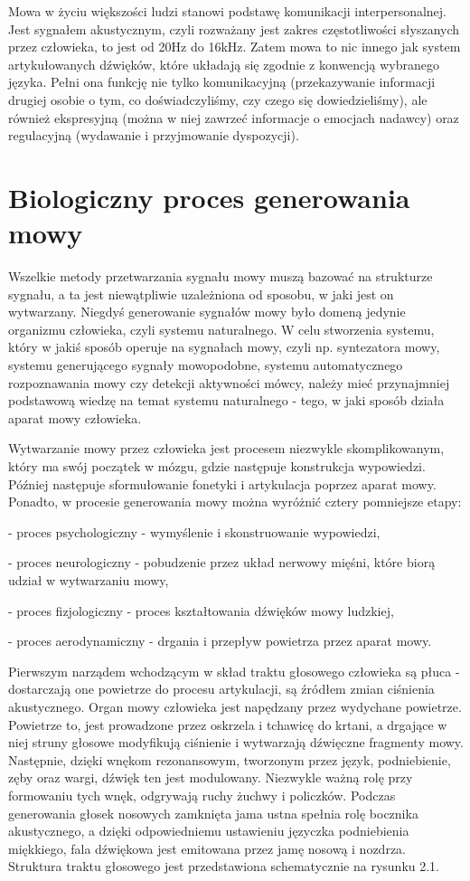 \documentclass[eng,printmode]{mgr}
\begin{document}
 Mowa w życiu większości ludzi stanowi podstawę komunikacji interpersonalnej. Jest sygnałem akustycznym, czyli rozważany jest zakres częstotliwości słyszanych przez człowieka, to jest od 20Hz do 16kHz. Zatem mowa to nic innego jak system artykułowanych dźwięków, które układają się zgodnie z konwencją wybranego języka. Pełni ona funkcję nie tylko komunikacyjną (przekazywanie informacji drugiej osobie o tym, co doświadczyliśmy, czy czego się dowiedzieliśmy), ale również ekspresyjną (można w niej zawrzeć informacje o emocjach nadawcy) oraz regulacyjną (wydawanie i przyjmowanie dyspozycji). 
 
 
 \section{Biologiczny proces generowania mowy}
 Wszelkie metody przetwarzania sygnału mowy muszą bazować na strukturze sygnału, a ta jest niewątpliwie uzależniona od sposobu, w jaki jest on wytwarzany. Niegdyś generowanie sygnałów mowy było domeną jedynie organizmu człowieka, czyli systemu naturalnego. W celu stworzenia systemu, który w jakiś sposób operuje na sygnałach mowy, czyli np. syntezatora mowy, systemu generującego sygnały mowopodobne, systemu automatycznego rozpoznawania mowy czy detekcji aktywności mówcy, należy mieć przynajmniej podstawową wiedzę na temat systemu naturalnego - tego, w jaki sposób działa aparat mowy człowieka.
 
 Wytwarzanie mowy przez człowieka jest procesem niezwykle skomplikowanym, który ma swój początek w mózgu, gdzie następuje konstrukcja wypowiedzi. Później następuje sformułowanie fonetyki i artykulacja poprzez aparat mowy. Ponadto, w procesie generowania mowy można wyróżnić cztery pomniejsze etapy:
	 
	 - proces psychologiczny - wymyślenie i skonstruowanie wypowiedzi,
	 
	 - proces neurologiczny - pobudzenie przez układ nerwowy mięśni, które biorą udział w wytwarzaniu mowy,
	 
	 - proces fizjologiczny - proces kształtowania dźwięków mowy ludzkiej,
	 
	 - proces aerodynamiczny - drgania i przepływ powietrza przez aparat mowy. 
  
  Pierwszym narządem wchodzącym w skład traktu głosowego człowieka są płuca - dostarczają one powietrze do procesu artykulacji, są źródłem zmian ciśnienia akustycznego. Organ mowy człowieka jest napędzany przez wydychane powietrze. Powietrze to, jest prowadzone przez oskrzela i tchawicę do krtani, a drgające w niej struny głosowe modyfikują ciśnienie i wytwarzają dźwięczne fragmenty mowy.  Następnie, dzięki wnękom rezonansowym, tworzonym przez język, podniebienie, zęby oraz wargi, dźwięk ten jest modulowany. Niezwykle ważną rolę przy formowaniu tych wnęk, odgrywają ruchy żuchwy i policzków. Podczas generowania głosek nosowych zamknięta jama ustna spełnia rolę bocznika akustycznego, a dzięki odpowiedniemu ustawieniu języczka podniebienia miękkiego, fala dźwiękowa jest emitowana przez jamę nosową i nozdrza. Struktura traktu głosowego jest przedstawiona schematycznie na rysunku 2.1.
\end{document}
